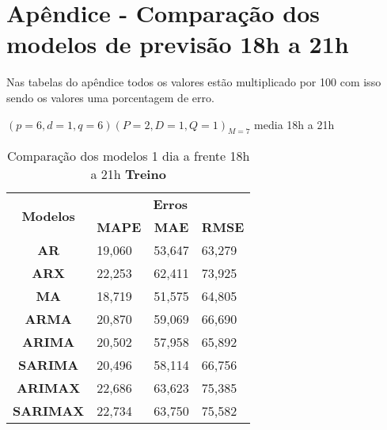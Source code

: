 
\section{Ap\^endice - Compara\c c\~ao dos modelos de previs\~ao 18h a 21h}\label{sec:comtb18}

Nas tabelas do apêndice todos os valores estão multiplicado por 100 com isso sendo os valores uma porcentagem de erro.

	$(p = 6,d = 1,q = 6) (P = 2,D = 1,Q = 1)_{M = 7}$ media 18h a 21h
	\begin{table}[H]
		\centering
		\caption{Comparação dos modelos 1 dia a frente 18h a 21h \textbf{Treino} }\label{tb:1-18trn}
\begin{tabular}{@{}clll@{}}
	\toprule
	\multirow{2}{*}{\textbf{Modelos}} & \multicolumn{3}{c}{\textbf{Erros}}                                                                       \\ \cmidrule(l){2-4} 
	& \multicolumn{1}{c}{\textbf{MAPE}} & \multicolumn{1}{c}{\textbf{MAE}} & \multicolumn{1}{c}{\textbf{RMSE}} \\ \hline
	\textbf{AR}                       & 19,060                            & 53,647                           & 63,279                            \\
	\textbf{ARX}                      & 22,253                            & 62,411                           & 73,925                            \\
	\textbf{MA}                       & 18,719                            & 51,575                           & 64,805                            \\
	\textbf{ARMA}                     & 20,870                            & 59,069                           & 66,690                            \\
	\textbf{ARIMA}                    & 20,502                            & 57,958                           & 65,892                            \\
	\textbf{SARIMA}                   & 20,496                            & 58,114                           & 66,756                            \\
	\textbf{ARIMAX}                   & 22,686                            & 63,623                           & 75,385                            \\
	\textbf{SARIMAX}                  & 22,734                            & 63,750                           & 75,582                            \\

\end{tabular}
\end{table}
